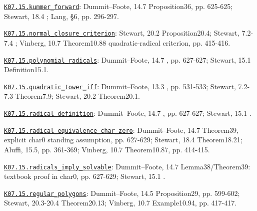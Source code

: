 \par\smallskip\noindent\hypertarget{src:K07.15.kummer_forward}{}\label{src:K07.15.kummer_forward}\hyperref[K07.15.kummer_forward]{\texttt{K07.15.kummer\_forward}}: Dummit--Foote, 14.7 Proposition36, pp. 625-625; Stewart, 18.4 ; Lang, §6, pp. 296-297.
\par\smallskip\noindent\hypertarget{src:K07.15.normal_closure_criterion}{}\label{src:K07.15.normal_closure_criterion}\hyperref[K07.15.normal_closure_criterion]{\texttt{K07.15.normal\_closure\_criterion}}: Stewart, 20.2 Proposition20.4; Stewart, 7.2-7.4 ; Vinberg, 10.7 Theorem10.88 quadratic-radical criterion, pp. 415-416.
\par\smallskip\noindent\hypertarget{src:K07.15.polynomial_radicals}{}\label{src:K07.15.polynomial_radicals}\hyperref[K07.15.polynomial_radicals]{\texttt{K07.15.polynomial\_radicals}}: Dummit--Foote, 14.7 , pp. 627-627; Stewart, 15.1 Definition15.1.
\par\smallskip\noindent\hypertarget{src:K07.15.quadratic_tower_iff}{}\label{src:K07.15.quadratic_tower_iff}\hyperref[K07.15.quadratic_tower_iff]{\texttt{K07.15.quadratic\_tower\_iff}}: Dummit--Foote, 13.3 , pp. 531-533; Stewart, 7.2-7.3 Theorem7.9; Stewart, 20.2 Theorem20.1.
\par\smallskip\noindent\hypertarget{src:K07.15.radical_definition}{}\label{src:K07.15.radical_definition}\hyperref[K07.15.radical_definition]{\texttt{K07.15.radical\_definition}}: Dummit--Foote, 14.7 , pp. 627-627; Stewart, 15.1 .
\par\smallskip\noindent\hypertarget{src:K07.15.radical_equivalence_char_zero}{}\label{src:K07.15.radical_equivalence_char_zero}\hyperref[K07.15.radical_equivalence_char_zero]{\texttt{K07.15.radical\_equivalence\_char\_zero}}: Dummit--Foote, 14.7 Theorem39, explicit char0 standing assumption, pp. 627-629; Stewart, 18.4 Theorem18.21; Aluffi, 15.5, pp. 361-369; Vinberg, 10.7 Theorem10.87, pp. 414-415.
\par\smallskip\noindent\hypertarget{src:K07.15.radicals_imply_solvable}{}\label{src:K07.15.radicals_imply_solvable}\hyperref[K07.15.radicals_imply_solvable]{\texttt{K07.15.radicals\_imply\_solvable}}: Dummit--Foote, 14.7 Lemma38/Theorem39: textbook proof in char0, pp. 627-629; Stewart, 15.1 .
\par\smallskip\noindent\hypertarget{src:K07.15.regular_polygons}{}\label{src:K07.15.regular_polygons}\hyperref[K07.15.regular_polygons]{\texttt{K07.15.regular\_polygons}}: Dummit--Foote, 14.5 Proposition29, pp. 599-602; Stewart, 20.3-20.4 Theorem20.13; Vinberg, 10.7 Example10.94, pp. 417-417.
